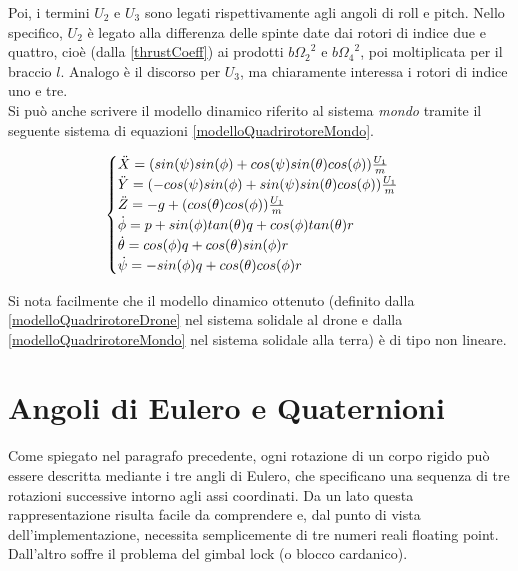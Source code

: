 Poi, i termini $U_2$ e $U_3$ sono legati rispettivamente agli angoli di roll e pitch. Nello specifico, $U_2$ è legato alla differenza delle spinte date dai rotori di indice due e quattro, cioè (dalla \ref{thrustCoeff}) ai prodotti $b{\Omega_2}^2$ e $b{\Omega_4}^2$, poi moltiplicata per il braccio $l$. Analogo è il discorso per $U_3$, ma chiaramente interessa i rotori di indice uno e tre.\\

Si può anche scrivere il modello dinamico riferito al sistema \emph{mondo} tramite il seguente sistema di equazioni \ref{modelloQuadrirotoreMondo}.

\begin{equation}
	\begin{cases}
	\Ddot{X} = (sin(\psi)sin(\phi) + cos(\psi)sin(\theta)cos(\phi))\frac{U_1}{m} \\
	\Ddot{Y} = (-cos(\psi)sin(\phi) + sin(\psi)sin(\theta)cos(\phi))\frac{U_1}{m} \\
	\Ddot{Z} = -g + (cos(\theta)cos(\phi))\frac{U_1}{m} \\
	\Dot{\phi} = p + sin(\phi)tan(\theta)q + cos(\phi)tan(\theta)r \\
	\Dot{\theta} = cos(\phi)q + cos(\theta)sin(\phi)r \\
	\Dot{\psi} = -sin(\phi)q + cos(\theta)cos(\phi)r
	\end{cases}
	\label{modelloQuadrirotoreMondo}
\end{equation}

Si nota facilmente che il modello dinamico ottenuto (definito dalla \ref{modelloQuadrirotoreDrone} nel sistema solidale al drone e dalla \ref{modelloQuadrirotoreMondo} nel sistema solidale alla terra) è di tipo non lineare.


\section{Angoli di Eulero e Quaternioni}
Come spiegato nel paragrafo precedente, ogni rotazione di un corpo rigido può essere descritta mediante i tre angli di Eulero, che specificano una sequenza di tre rotazioni successive intorno agli assi coordinati. Da un lato questa rappresentazione risulta facile da comprendere e, dal punto di vista dell'implementazione, necessita semplicemente di tre numeri reali floating point. Dall'altro soffre il problema del gimbal lock (o blocco cardanico).\\

